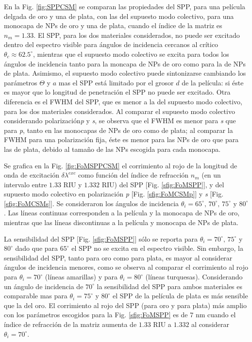 En la Fig. \ref{fig:SPPCSM} se comparan las propiedades del SPP, para una película delgada de oro y una de plata, con las del supuesto modo colectivo, para una monocapa de NPs de oro y una de plata, cuando el índice de la matriz es $n_m=1.33$. El SPP, para los dos materiales considerados, no puede ser excitado dentro del espectro visible para ángulos de incidencia cercanos al crítico $\theta_c\approx 62.5^\circ$, mientras que el supuesto modo colectivo se excita para todos los ángulos de incidencia tanto para la moncapa de NPs de oro como para la de NPs de plata. Asimismo, el supuesto modo colectivo puede sintonizarse  cambiando los parámetros $\Theta$ y $a$ mas el SPP está limitado por el grosor $d$ de la película: si éste es mayor que lo longitud de penetración el SPP no puede ser excitado. Otra diferencia es el FWHM del SPP, que es menor a la del supuesto modo colectivo, para los dos materiales considerados. Al comparar el supuesto modo colectivo considerando polarización\emph{p} y \emph{s},  se observa  que el FWHM es menor para \emph{s} que para \emph{p}, tanto en las monocapas de NPs de oro como de plata; al comparar la FWHM para una polarización fija, éste es menor para las NPs de oro que para las de plata, debido al tamaño de las NPs escogida para cada monocapa.

Se grafica en la Fig. \ref{fig:FoMSPPCSM} el corrimiento al rojo de la longitud de onda de excitación $\delta\lambda^{exc}$ como función del índice de refracción $n_m$ (en un intervalo entre $1.33$ RIU y $1.332$ RIU)  del SPP [Fig. \ref{sfig:FoMSPP}], y del supuesto modo colectivo en polarización \emph{p} [Fig. \ref{sfig:FoMCSMp}] y \emph{s} [Fig. \ref{sfig:FoMCSMs}]. Se consideraron los ángulos de incidencia $\theta_i=65^\circ,\, 70^\circ,\, 75^\circ$ y $80^\circ$. Las líneas continuas corresponden a la película y la monocapa de NPs de oro, mientras que las líneas discontinuas a la película y monocapa de NPs de plata. 

La sensibilidad del SPP [Fig. \ref{sfig:FoMSPP}] sólo se reporta para $\theta_i=70^\circ,\, 75^\circ$ y $80^\circ$ dado que para $65^\circ$ el SPP no se excita en el espectro visible. Sin embargo, la sensibilidad del SPP, tanto para oro como para plata, es mayor al considerar ángulos de incidencia  menores, como se observa al comparar el corrimiento al rojo para $\theta_i=70^\circ$ (líneas amarillas) y  para $\theta_i=80^\circ$ (líneas turquesas).  Considerando un ángulo de incidencia de $70^\circ$ la sensibilidad del SPP para ambos materiales es comparable mas para $\theta_i=75^\circ$ y $80^\circ$ el SPP de la película de plata es más sensible que la del oro. El corrimiento al rojo del SPP (para oro y para plata) más amplio con los parámetros escogidos para la Fig. \ref{sfig:FoMSPP} es de $7$ nm cuando el índice de refracción de la matriz  aumenta de $1.33$ RIU a $1.332$ al considerar $\theta_i=70^\circ$.

